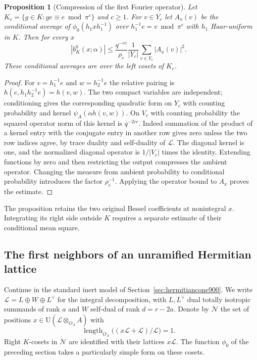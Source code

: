 \documentclass[a4paper,11pt]{article}
\newtheorem{proposition}{Proposition}[section]
\theoremstyle{definition}
\theoremstyle{remark}
\numberwithin{equation}{section}
\begin{document}
\begin{proposition}[Compression of the first Fourier operator]
\leavevmode\label{prop:inertoperator900}
Let \(K_c=\{g\in K:ge\equiv e\bmod\pi^c\}\) and \(c\ge1\).
For \(v\in Y_c\) let \(A_x(v)\) be the conditional average of
\(\phi_0(h_1xh_1^{-1})\) over \(h_1^{-1}e=v\bmod\pi^c\)
with \(h_1\) Haar-uniform in \(K\). Then for every \(x\)
\[
  |b^0_K(x;\alpha)|\le
     \frac{q^{-rc}}{\rho_c}
           \frac{1}{|Y_c|}\sum_{v\in Y_c}|A_x(v)|^2 .
\]
These conditional averages are over the left cosets of \(K_c\).
\end{proposition}
\begin{proof}
For \(v=h_1^{-1}e\) and \(w=h_2^{-1}e\) the relative pairing is
\(h(e,h_1h_2^{-1}e)=h(v,w)\). The two compact variables are
independent; conditioning gives the corresponding quadratic form
on \(Y_c\) with counting probability and kernel
\(\psi_A(\alpha h(v,w))\). On \(V_c\) with counting probability
the squared operator norm of this kernel is \(q^{-2rc}\).
Indeed summation of the product of a kernel entry with the
conjugate entry in another row gives zero unless the two row
indices agree, by trace duality and self-duality of \(\mathcal L\).
The diagonal kernel is one, and the normalized diagonal operator
is \(1/|V_c|\) times the identity. Extending functions by zero
and then restricting the output compresses the ambient operator.
Changing the measure from ambient probability to conditional
probability introduces the factor \(\rho_c^{-1}\). Applying the
operator bound to \(A_x\) proves the estimate.
\end{proof}

The proposition retains the two original Bessel coefficients at
nonintegral \(x\). Integrating its right side outside \(K\)
requires a separate estimate of their conditional mean square.
\clearpage

\subsection{The first neighbors of an unramified Hermitian lattice}
\label{sec:inertneighbor901}

Continue in the standard inert model of Section~\ref{sec:hermitiancone900}.
We write \(\mathcal L=L\oplus W\oplus L^\vee\) for the integral
decomposition, with \(L,L^\vee\) dual totally isotropic summands
of rank \(a\) and \(W\) self-dual of rank \(d=r-2a\). Denote by
\(\mathcal N\) the set of positions \(x\in\mathrm U(\mathcal L
\otimes_{O_A}A)\) with
\[
       \operatorname{length}_{O_A}
       \big((x\mathcal L+\mathcal L)/\mathcal L\big)=1.
\]
Right \(K\)-cosets in \(\mathcal N\) are identified with their
lattices \(x\mathcal L\). The function \(\phi_0\) of the preceding
section takes a particularly simple form on these cosets.
\end{document}
